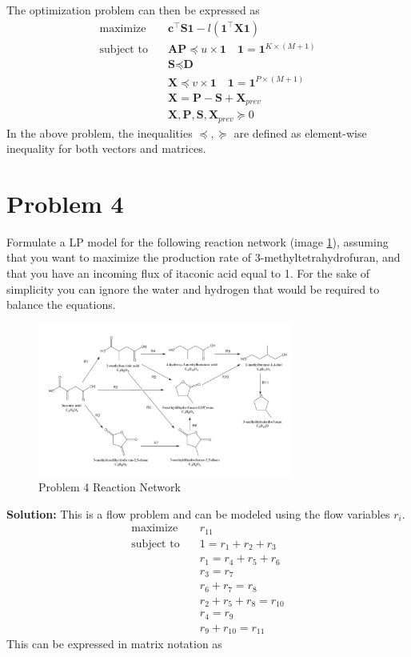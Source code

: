 \documentclass[11pt]{article}
\begin{document}
The optimization problem can then be expressed as
\begin{align*}
  \text{maximize} & \quad \textbf{c}^\top \textbf{S} \textbf{1} - l(\textbf{1}^\top \textbf{X} \textbf{1}) \\
  \text{subject to} & \quad \textbf{A} \textbf{P} \preceq u \times \textbf{1} \quad \textbf{1} = \textbf{1}^{K \times (M+1)}\\
  & \quad \textbf{S} \preceq \textbf{D} \\
  & \quad \textbf{X} \preceq v \times \textbf{1} \quad \textbf{1} = \textbf{1}^{P \times (M+1)}\\
  & \quad \textbf{X} = \textbf{P} - \textbf{S} + \textbf{X}_{prev} \\
  & \quad \textbf{X}, \textbf{P}, \textbf{S}, \textbf{X}_{prev} \succeq 0
\end{align*}
In the above problem, the inequalities $\preceq, \succeq$ are defined as element-wise inequality for both vectors and matrices.




\section{Problem 4}
Formulate a LP model for the following reaction network (image \ref{fig:problem_4_rn}), assuming that you want
to maximize the production rate of 3-methyltetrahydrofuran, and that you have an incoming
flux of itaconic acid equal to 1. For the sake of simplicity you can ignore the water and
hydrogen that would be required to balance the equations.
\begin{figure}[htbp]
  \centerline{\includegraphics[width=0.75\textwidth]{images/image.png}}
  \caption{Problem 4 Reaction Network}
  \label{fig:problem_4_rn}
\end{figure}

\textbf{Solution: }
This is a flow problem and can be modeled using the flow variables $r_i$.
\begin{align*}
  \text{maximize} & \quad r_{11} \\
  \text{subject to} & \quad 1 = r_1 + r_2 + r_3 \\
  & \quad r_1 = r_4 + r_5 + r_6 \\
  & \quad r_3 = r_7 \\
  & \quad r_6 + r_7 = r_8 \\
  & \quad r_2 + r_5 + r_8 = r_{10} \\
  & \quad r_4 = r_9 \\
  & \quad r_9 + r_{10} = r_{11}
\end{align*}
This can be expressed in matrix notation as
\end{document}
